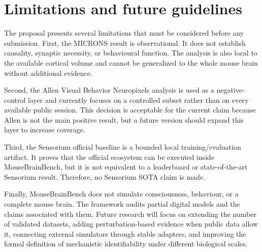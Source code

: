 \section{Limitations and future guidelines}

The proposal presents several limitations that must be considered before any
submission. First, the MICRONS result is observational. It does not establish
causality, synaptic necessity, or behavioural function. The analysis is also
local to the available cortical volume and cannot be generalized to the whole
mouse brain without additional evidence.

Second, the Allen Visual Behavior Neuropixels analysis is used as a
negative-control layer and currently focuses on a controlled subset rather than
on every available public session. This decision is acceptable for the current
claim because Allen is not the main positive result, but a future version should
expand this layer to increase coverage.

Third, the Sensorium official baseline is a bounded local
training/evaluation artifact. It proves that the official ecosystem can be
executed inside MouseBrainBench, but it is not equivalent to a leaderboard or
state-of-the-art Sensorium result. Therefore, no Sensorium SOTA claim is made.

Finally, MouseBrainBench does not simulate consciousness, behaviour, or a
complete mouse brain. The framework audits partial digital models and the claims
associated with them. Future research will focus on extending the number of
validated datasets, adding perturbation-based evidence when public data allow
it, connecting external simulators through stable adapters, and improving the
formal definition of mechanistic identifiability under different biological
scales.
